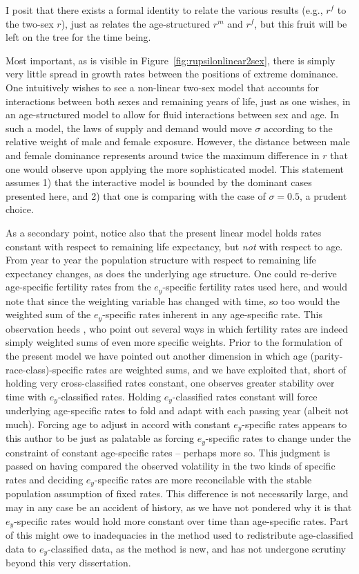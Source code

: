 \FloatBarrier
I posit that there exists a formal identity to relate the various results
(e.g., $r^f$ to the two-sex $r$), just as \citet[p. 56]{coale1972growth}
relates the age-structured $r^m$ and $r^f$, but this fruit will be left on the tree
for the time being.

Most important, as is visible in Figure~\ref{fig:rupsilonlinear2sex}, there is
simply very little spread in growth rates between the positions of extreme
dominance. One intuitively wishes to see a non-linear two-sex model that
accounts for interactions between both sexes and remaining years of life, just
as one wishes, in an age-structured model to allow for fluid interactions
between sex and age. In such a model, the laws of supply and demand would move
$\sigma$ according to the relative weight of male and female exposure. However,
the distance between male and female dominance represents around twice the
maximum difference in $r$ that one would observe upon applying the more
sophisticated model. This statement assumes 1) that the interactive model is
bounded by the dominant cases presented here, and 2) that one is comparing with
the case of $\sigma = 0.5$, a prudent choice. 

As a secondary point, notice also that the present linear model holds rates
constant with respect to remaining life expectancy, but \textit{not} with
respect to age. From year to year the population structure with
respect to remaining life expectancy changes, as does the underlying age
structure. One could re-derive age-specific fertility rates from the
$e_y$-specific fertility rates used here, and would note that since the
weighting variable has changed with time, so too would the weighted sum of
the $e_y$-specific rates inherent in any age-specific rate. This observation
heeds \citet{stolnitz1949recent}, who point out several ways in which
fertility rates are indeed simply weighted sums of even more specific weights.
Prior to the formulation of the present model we have pointed out another
dimension in which age (parity-race-class)-specific rates are weighted sums, and we have exploited
that, short of holding very cross-classified rates constant, one observes
greater stability over time with $e_y$-classified rates. Holding
$e_y$-classified rates constant will force underlying age-specific rates to fold
and adapt with each passing year (albeit not much). Forcing age to adjust in
accord with constant $e_y$-specific rates appears to this author to be just as
palatable as forcing $e_y$-specific rates to change under the constraint of
constant age-specific rates -- perhaps more so. This judgment is passed on
having compared the observed volatility in the two kinds of specific rates and deciding
$e_y$-specific rates are more reconcilable with the stable population
assumption of fixed rates. This difference is not necessarily large, and may in
any case be an accident of history, as we have not pondered why it is that
$e_y$-specific rates would hold more constant over time than age-specific rates.
Part of this might owe to inadequacies in the method used to redistribute
age-classified data to $e_y$-classified data, as the method is new, and has not
undergone scrutiny beyond this very dissertation.